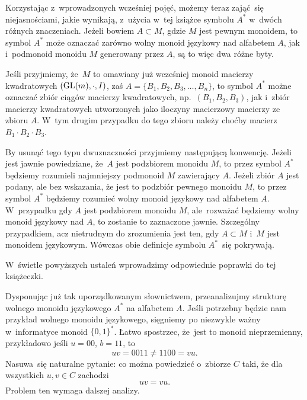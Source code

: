 \documentclass[a4paper,11pt]{article}
\begin{document}
\start {} Korzystając z~wprowadzonych wcześniej pojęć, możemy teraz
zająć~się niejasnościami, jakie wynikają, z~użycia w~tej książce symbolu
$A^{ * }$ w~dwóch różnych znaczeniach. Jeżeli bowiem $A \subset M$, gdzie $M$ jest
pewnym monoidem, to symbol $A^{ * }$ może oznaczać zarówno wolny monoid
językowy nad alfabetem $A$, jak i~podmonoid monoidu $M$ generowany przez
$A$, są to więc dwa różne byty.

Jeśli przyjmiemy, że~$M$ to omawiany już wcześniej monoid macierzy
kwadratowych $( \mathrm{GL}( m ), \cdot, I )$, zaś
$A = \{ B_{ 1 }, B_{ 2 }, B_{ 3 }, \ldots, B_{ n } \}$, to symbol $A^{ * }$ możne
oznaczać zbiór ciągów macierzy kwadratowych,
np.~$( B_{ 1 }, B_{ 2 }, B_{ 3 } )$, jak i~zbiór macierzy kwadratowych
utworzonych jako iloczyny macierzowy macierzy ze zbioru $A$. W~tym drugim
przypadku do tego zbioru należy choćby macierz $B_{ 1 } \cdot B_{ 2 } \cdot B_{ 3 }$.

By usunąć tego typu dwuznaczności przyjmiemy następującą konwencję. Jeżeli
jest jawnie powiedziane, że~$A$ jest podzbiorem monoidu $M$, to przez symbol
$A^{ * }$ będziemy rozumieli najmniejszy podmonoid $M$ zawierający $A$.
Jeżeli zbiór $A$ jest podany, ale bez wskazania, że jest to podzbiór pewnego
monoidu $M$, to przez symbol $A^{ * }$ będziemy rozumieć wolny monoid
językowy nad alfabetem $A$. W~przypadku gdy $A$ jest podzbiorem monoidu $M$,
ale~rozważać będziemy wolny monoid językowy nad $A$, to zostanie to
zaznaczone jawnie. Szczególny przypadkiem, acz nietrudnym do zrozumienia
jest ten, gdy $A \subset M$ i~$M$ jest monoidem językowym. Wówczas obie definicje
symbolu $A^{ * }$~się pokrywają.

W~świetle powyższych ustaleń wprowadzimy odpowiednie poprawki do tej
książeczki.

\vspace{\spaceFour}



\start {} Dysponując już tak uporządkowanym słownictwem, przeanalizujmy
strukturę wolnego monoidu językowego $A^{ * }$ na alfabetem $A$. Jeśli potrzebny będzie nam przykład wolnego monoidu językowego, sięgniemy po
niezwykle ważny w~informatyce monoid $\{ 0, 1 \}^{ * }$. Łatwo spostrzec,
że~jest to monoid nieprzemienny, przykładowo jeśli $u = 00$, $b = 11$, to
\begin{equation}
  \label{eq:Forys-Forys-05}
  u v = 0011 \neq 1100 = vu.
\end{equation}
Nasuwa~się naturalne pytanie: co można powiedzieć o~zbiorze $C$ taki, że dla
wszystkich $u, v \in C$ zachodzi
\begin{equation}
  \label{eq:Forys-Forys-06}
  uv = vu.
\end{equation}
Problem ten wymaga dalszej analizy.
\end{document}
